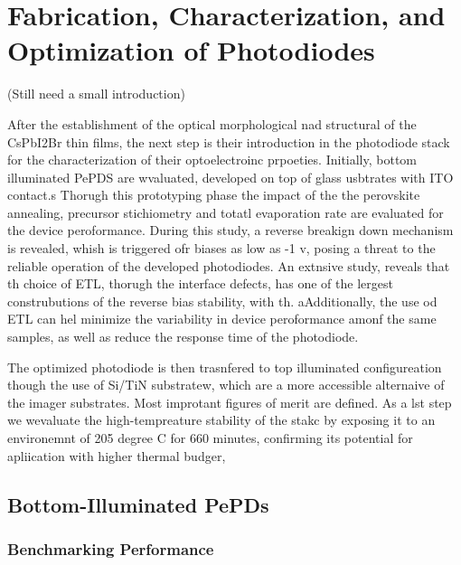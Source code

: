 \chapter{Fabrication, Characterization, and Optimization of  Photodiodes}\label{ch:transport_layer}

(Still need a small introduction)


After the establishment of the optical morphological nad structural of the CsPbI2Br thin films, the next step is their introduction in the photodiode stack for the characterization of their optoelectroinc prpoeties. Initially, bottom illuminated PePDS are wvaluated, developed on top of glass usbtrates with ITO contact.s Thorugh this prototyping phase the impact of the the perovskite annealing, precursor stichiometry and totatl evaporation rate are evaluated for the device peroformance. During this study, a reverse breakign down mechanism is revealed, whish is triggered ofr biases as low as -1 v, posing a threat to the reliable operation of the developed photodiodes. An extnsive study, reveals that th choice of ETL, thorugh the interface defects, has one of the lergest construbutions of the reverse bias stability, with th. aAdditionally, the use od ETL can hel minimize the variability in device peroformance amonf the same samples, as well as reduce the response time of the photodiode. 

The optimized photodiode is then trasnfered to top illuminated configureation though the use of Si/TiN substratew, which are a more accessible alternaive of the imager substrates. Most improtant figures of merit are defined. As a lst step we wevaluate the high-tempreature stability of the stakc by exposing it to an environemnt of 205 degree C for 660 minutes, confirming its potential for apliication with higher thermal budger, 



\section{Bottom-Illuminated PePDs}

\subsection{Benchmarking Performance}

